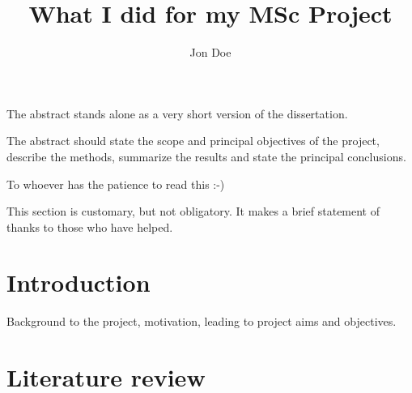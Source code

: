\documentclass{mscthesis}
\title{What I did for my MSc Project}    %
\author{Jon Doe}                      %
\begin{document}
\setlength{\parindent}{0pt}

  \onehalfspacing

  \begin{singlespace}

  \beforepreface


    The abstract stands alone as a very short version of the dissertation.
    
    The abstract should state the scope and principal objectives of the project, describe the methods, summarize the results and state the principal conclusions.
    




    \null\vskip1.5in
    \begin{center}

    To whoever has the patience to read this :-)
    
    This section is customary, but not obligatory.  It makes a brief statement of thanks to those who have helped.

    \end{center}

  \afterpreface

  \end{singlespace}

\chapter{Introduction}

Background to the project, motivation, leading to project aims and objectives.

\chapter{Literature review}
\end{document}
